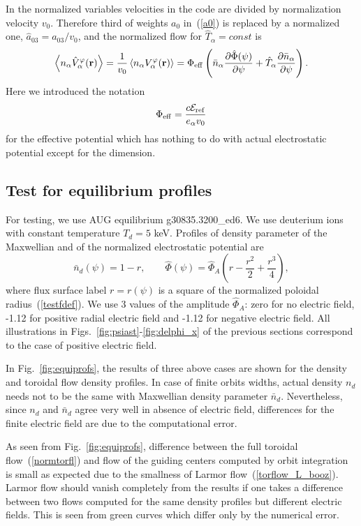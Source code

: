 \documentclass[preprint,prb,aps]{revtex4-1}
\newcommand{\be}[1]{\begin{equation} \label{#1}}
\newcommand{\ee}{\end{equation}}
\newcommand{\eq}[1]{(\ref{#1})}
\newcommand{\difp}[2]{\frac{\partial #1}{\partial #2}}
\newcommand{\br}{{\bf r}}
\begin{document}
%
In the normalized variables velocities in the code are divided by normalization
velocity $v_0$.
Therefore third of weights $a_0$ in~\eq{a0} is replaced by a normalized
one, $\hat a_{03} = a_{03}/v_0$, and the normalized flow for $\hat T_\alpha = const$ 
is
\be{normtorfl}
\left\langle n_\alpha \hat V_\alpha^\varphi(\br) \right\rangle
=
\frac{1}{v_0}\left\langle n_\alpha V_\alpha^\varphi(\br) \right\rangle
=
\Phi_{\rm eff}
\left(\bar n_\alpha\difp{\hat \Phi(\psi)}{\psi}
+\hat T_\alpha\difp{\bar n_\alpha}{\psi}\right).
\ee
Here we introduced the notation 
\be{Phieff}
\Phi_{\rm eff}=\frac{c {\cal E}_{\rm ref}}{e_\alpha v_0}
\ee
for the effective potential which has nothing to do with actual
electrostatic potential except for the dimension.

\subsection{Test for equilibrium profiles}
\label{ssec:testprof}

For testing, we use AUG equilibrium g30835.3200\_ed6. We use deuterium ions
with constant temperature $T_d = 5$ keV. Profiles of density parameter
of the Maxwellian and of the normalized electrostatic potential are
\be{equi_input}
\bar n_d(\psi) = 1 - r,
\qquad
\hat \Phi(\psi) = \hat\Phi_A \left(r -\frac{r^2}{2}+\frac{r^3}{4}\right),
\ee
where flux surface label $r=r(\psi)$ is a square of the normalized poloidal 
radius~\eq{testfdef}. We use 3 values of the amplitude $\hat\Phi_A$: zero
for no electric field, -1.12 for positive radial electric field and -1.12 for
negative electric field. All illustrations in 
Figs.~\ref{fig:psiast}-\ref{fig:delphi_x} of the previous sections
correspond to the case of positive electric field.

In Fig.~\ref{fig:equiprofs}, the results of three above cases are shown for
the density and toroidal flow density profiles. In case of finite orbits widths,
actual density $n_d$ needs not to be the same with Maxwellian density parameter
$\bar n_d$. Nevertheless, since $n_d$ and $\bar n_d$ agree very well in absence
of electric field, differences for the finite electric field are due to the
computational error.

As seen from Fig.~\ref{fig:equiprofs}, 
difference between the full toroidal flow~\eq{normtorfl} and flow of the guiding 
centers computed by orbit integration is small as expected due to the smallness of
Larmor flow~\eq{torflow_L_booz}. Larmor flow should vanish completely from the 
results if one takes a difference between two flows computed for the same density
profiles but different electric fields. This is seen from green curves which differ
only by the numerical error.
\end{document}
